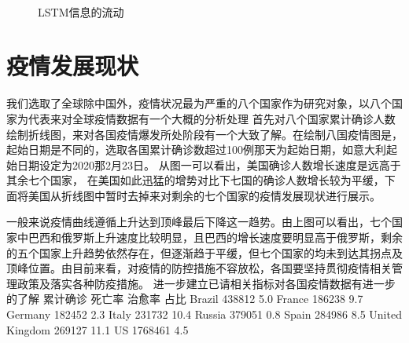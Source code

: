 \documentclass[lang=cn,11pt,a4paper,cite=authoryear]{elegantpaper}
\begin{document}
\begin{figure}[htp]
	\centering
	\\
    \caption{LSTM信息的流动}
	\label{fig:LSTM}
\end{figure}

\section{疫情发展现状}

我们选取了全球除中国外，疫情状况最为严重的八个国家作为研究对象，以八个国家为代表来对全球疫情数据有一个大概的分析处理
首先对八个国家累计确诊人数绘制折线图，来对各国疫情爆发所处阶段有一个大致了解。在绘制八国疫情图是，起始日期是不同的，选取各国累计确诊数超过100例那天为起始日期，如意大利起始日期设定为2020那2月23日。   
从图一可以看出，美国确诊人数增长速度是远高于其余七个国家， 在美国如此迅猛的增势对比下七国的确诊人数增长较为平缓，下面将美国从折线图中暂时去掉来对剩余的七个国家的疫情发展现状进行展示。

一般来说疫情曲线遵循上升达到顶峰最后下降这一趋势。由上图可以看出，七个国家中巴西和俄罗斯上升速度比较明显，且巴西的增长速度要明显高于俄罗斯，剩余的五个国家上升趋势依然存在，但逐渐趋于平缓，但七个国家的均未到达其拐点及顶峰位置。由目前来看，对疫情的防控措施不容放松，各国要坚持贯彻疫情相关管理政策及落实各种防疫措施。
进一步建立已请相关指标对各国疫情数据有进一步的了解
	累计确诊	死亡率	治愈率	占比
Brazil	438812	5.0%
France	186238	9.7%
Germany	182452	2.3%
Italy	231732	10.4%
Russia	379051	0.8%
Spain	284986	8.5%
United Kingdom	269127	11.1%
US	1768461	4.5%
\end{document}
